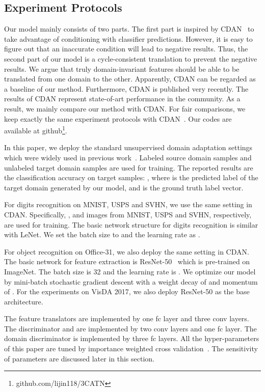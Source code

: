 \documentclass[sigconf]{acmart}
\begin{document}
 \subsection{Experiment Protocols}
Our model mainly consists of two parts. The first part is inspired by CDAN~\cite{long2018conditional} to take advantage of conditioning with classifier predictions. However, it is easy to figure out that an inaccurate condition will lead to negative results. Thus, the second part of our model is a cycle-consistent translation to prevent the negative results. We argue that truly domain-invariant features should be able to be translated from one domain to the other. Apparently, CDAN can be regarded as a baseline of our method. Furthermore, CDAN is published very recently. The results of CDAN represent state-of-art performance in the community. As a result, we mainly compare our method with CDAN. For fair comparisons, we keep exactly the same experiment protocols with CDAN~\cite{long2018conditional}. Our codes are available at github\footnote{github.com/lijin118/3CATN}.


In this paper, we deploy the standard unsupervised domain adaptation settings which were widely used in previous work~\cite{long2018conditional,gong2012geodesic}. Labeled source domain samples  and unlabeled target domain samples  are used for training. The reported results are the classification accuracy on target samples:
, where  is the predicted label of the target domain generated by our model, and  is the ground truth label vector. 

For digits recognition on MNIST, USPS and SVHN, we use the same setting in CDAN. Specifically, ,  and  images from MNIST, USPS and SVHN, respectively, are used for training. The basic network structure for digits recognition is similar with LeNet. We set the batch size to  and the learning rate as .

For object recognition on Office-31, we also deploy the same setting in CDAN. The basic network for feature extraction is ResNet-50~\cite{he2016deep} which is pre-trained on ImageNet. The batch size is 32 and the learning rate is . We optimize our model by mini-batch stochastic gradient descent with a weight decay of  and momentum of . For the experiments on VisDA 2017, we also deploy ResNet-50 as the base architecture.

The feature translators are implemented by one fc layer and three conv layers. The discriminator  and  are implemented by two conv layers and one fc layer. The domain discriminator  is implemented by three fc layers. All the hyper-parameters of this paper are tuned by importance weighted cross validation~\cite{sugiyama2007covariate}. The sensitivity of parameters are discussed later in this section. 
\end{document}

